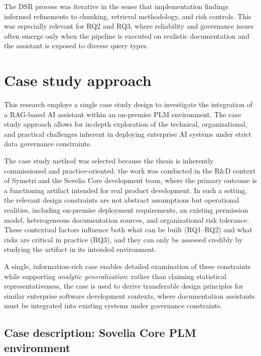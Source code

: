The DSR process was iterative in the sense that implementation findings informed refinements to chunking, retrieval methodology, and risk controls. This was especially relevant for RQ2 and RQ3, where reliability and governance issues often emerge only when the pipeline is executed on realistic documentation and the assistant is exposed to diverse query types.

\section{Case study approach}
\label{sec:case-study-approach}

This research employs a single case study design \parencite{yinCaseStudyResearch2018} to investigate the integration of a RAG-based AI assistant within an on-premise PLM environment. The case study approach allows for in-depth exploration of the technical, organizational, and practical challenges inherent in deploying enterprise AI systems under strict data governance constraints.

The case study method was selected because the thesis is inherently commissioned and practice-oriented: the work was conducted in the R\&D context of Symetri and the Sovelia Core development team, where the primary outcome is a functioning artifact intended for real product development. In such a setting, the relevant design constraints are not abstract assumptions but operational realities, including on-premise deployment requirements, an existing permission model, heterogeneous documentation sources, and organizational risk tolerance. These contextual factors influence both what can be built (RQ1--RQ2) and what risks are critical in practice (RQ3), and they can only be assessed credibly by studying the artifact in its intended environment.

A single, information-rich case enables detailed examination of these constraints while supporting \emph{analytic generalization}: rather than claiming statistical representativeness, the case is used to derive transferable design principles for similar enterprise software development contexts, where documentation assistants must be integrated into existing systems under governance constraints.

\subsection{Case description: Sovelia Core PLM environment}
\label{subsec:case-description}

